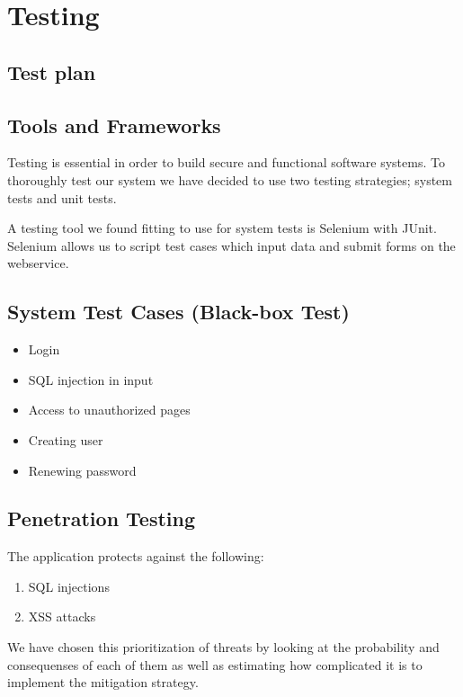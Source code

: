\documentclass[a4paper]{article}
\begin{document}
\section{Testing}

\subsection{Test plan}

\subsection{Tools and Frameworks}
Testing is essential in order to build secure and functional software systems. To thoroughly test our system we have decided to use two testing strategies; system tests and unit tests.

A testing tool we found fitting to use for system tests is Selenium with JUnit. Selenium allows us to script test cases which input data and submit forms on the webservice.

\subsection{System Test Cases (Black-box Test)}

\begin{itemize}
\item Login
\item SQL injection in input
\item Access to unauthorized pages
\item Creating user
\item Renewing password
\end{itemize}

\subsection{Penetration Testing}
The application protects against the following:
\begin{enumerate}
\item{SQL injections}
\item{XSS attacks}
\end{enumerate}

We have chosen this prioritization of threats by looking at the probability and consequenses of each of them as well as estimating how complicated it is to implement the mitigation strategy.
\end{document}
